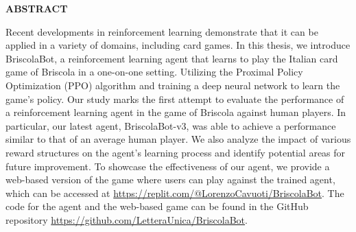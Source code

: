 \begin{center}
    \bf ABSTRACT
\end{center}
Recent developments in reinforcement learning demonstrate that it can be applied in a variety of domains, including card games. In this thesis, we introduce BriscolaBot, a reinforcement learning agent that learns to play the Italian card game of Briscola in a one-on-one setting. Utilizing the Proximal Policy Optimization (PPO) algorithm and training a deep neural network to learn the game's policy. Our study marks the first attempt to evaluate the performance of a reinforcement learning agent in the game of Briscola against human players. In particular, our latest agent, BriscolaBot-v3, was able to achieve a performance similar to that of an average human player. We also analyze the impact of various reward structures on the agent's learning process and identify potential areas for future improvement. To showcase the effectiveness of our agent, we provide a web-based version of the game where users can play against the trained agent, which can be accessed at \url{https://replit.com/@LorenzoCavuoti/BriscolaBot}. The code for the agent and the web-based game can be found in the GitHub repository \url{https://github.com/LetteraUnica/BriscolaBot}.